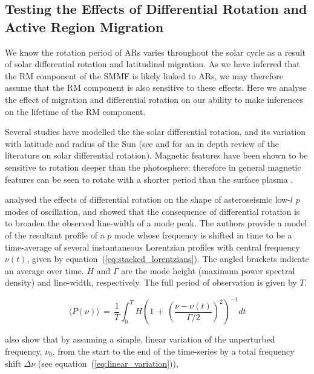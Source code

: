  
\subsection{Testing the Effects of Differential Rotation and Active Region Migration}
\label{sec:smearing}

We know the rotation period of ARs varies throughout the solar cycle as a result of solar differential rotation and latitudinal migration. As we have inferred that the RM component of the SMMF is likely linked to ARs, we may therefore assume that the RM component is also sensitive to these effects. Here we analyse the effect of migration and differential rotation on our ability to make inferences on the lifetime of the RM component.

Several studies have modelled the the solar differential rotation, and its variation with latitude and radius of the Sun (see \citet{beck_comparison_2000} and \cite{howe_solar_2009} for an in depth review of the literature on solar differential rotation). Magnetic features have been shown to be sensitive to rotation deeper than the photosphere; therefore in general magnetic features can be seen to rotate with a shorter period than the surface plasma \citep{howe_solar_2009}.

\citet{chaplin_distortion_2008} analysed the effects of differential rotation on the shape of asteroseismic low-$l$ $p$ modes of oscillation, and showed that the consequence of differential rotation is to broaden the observed line-width of a mode peak. The authors provide a model of the resultant profile of a $p$ mode whose frequency is shifted in time to be a time-average of several instantaneous Lorentzian profiles with central frequency $\nu(t)$, given by equation~(\ref{eq:stacked_lorentzians}). The angled brackets indicate an average over time. $H$ and $\Gamma$ are the mode height (maximum power spectral density) and line-width, respectively. The full period of observation is given by $T$.

\begin{equation}
\langle P(\nu) \rangle \, = \, \frac{1}{T} \int^T_0 H \left( 1 \, + \, \left( \frac{\nu - \nu(t)}{\Gamma /2} \right)^2 \right)^{-1} dt
\label{eq:stacked_lorentzians}
\end{equation}

\citet{chaplin_distortion_2008} also show that by assuming a simple, linear variation of the unperturbed frequency, $\nu_0$, from the start to the end of the time-series by a total frequency shift $\Delta\nu$ (see equation~(\ref{eq:linear_variation})),

